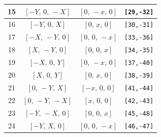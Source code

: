 \documentclass[fleqn,8pt]{jsarticle}
\begin{document}
\begin{longtable}{cccc}
15 & $\left[ - Y,\, 0,\, - X \right]$ & $\left[ 0,\, - x,\, 0 \right]$ & {\tt [29,-32]} \\ \hline
16 & $\left[ - Y,\, 0,\, X \right]$ & $\left[ 0,\, x,\, 0 \right]$ & {\tt [30,-31]} \\ \hline
17 & $\left[ - X,\, - Y,\, 0 \right]$ & $\left[ 0,\, 0,\, - x \right]$ & {\tt [33,-36]} \\ \hline
18 & $\left[ X,\, - Y,\, 0 \right]$ & $\left[ 0,\, 0,\, x \right]$ & {\tt [34,-35]} \\ \hline
19 & $\left[ - X,\, 0,\, Y \right]$ & $\left[ 0,\, - x,\, 0 \right]$ & {\tt [37,-40]} \\ \hline
20 & $\left[ X,\, 0,\, Y \right]$ & $\left[ 0,\, x,\, 0 \right]$ & {\tt [38,-39]} \\ \hline
21 & $\left[ 0,\, - Y,\, X \right]$ & $\left[ - x,\, 0,\, 0 \right]$ & {\tt [41,-44]} \\ \hline
22 & $\left[ 0,\, - Y,\, - X \right]$ & $\left[ x,\, 0,\, 0 \right]$ & {\tt [42,-43]} \\ \hline
23 & $\left[ - Y,\, - X,\, 0 \right]$ & $\left[ 0,\, 0,\, x \right]$ & {\tt [45,-48]} \\ \hline
24 & $\left[ - Y,\, X,\, 0 \right]$ & $\left[ 0,\, 0,\, - x \right]$ & {\tt [46,-47]} \\
\end{longtable}
\renewcommand{\arraystretch}{1.2}
\end{document}
